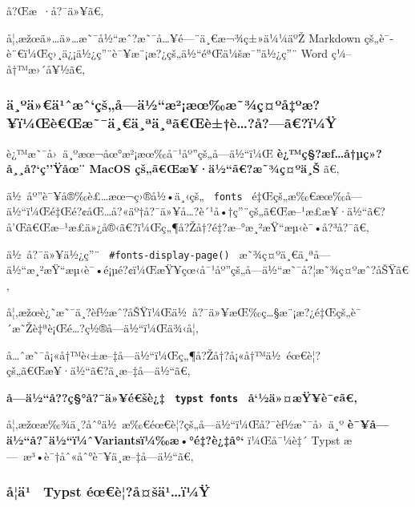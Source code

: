 å?Œæ~·å?¯ä»¥ã€‚

å¦‚æžœä»\ldots ä»\ldots æ˜¯å½``æˆ?æ˜¯å\ldots¥é---¨ä¸€æ¬¾ç±»ä¼¼äºŽ
Markdown çš„è¯­è¨€ï¼Œç›¸ä¿¡ä½¿ç''¨è¯¥æ¨¡æ?¿çš„ä½``éªŒä¼šæ¯''ä½¿ç''¨ Word
ç¼--å†™æ›´å¥½ã€‚

\subsubsection{ä¸ºä»€ä¹ˆæˆ`çš„å­---ä½``æ²¡æœ‰æ˜¾ç¤ºå‡ºæ?¥ï¼Œè€Œæ˜¯ä¸€ä¸ªä¸ªã€Œè±†è\ldots?å?---ã€?ï¼Ÿ}\label{uxe4uxbauxe4uxe4uxb9ux2c6uxe6ux2c6uxe7ux161uxe5uxe4uxbduxe6uxb2uxe6ux153uxe6uxbeuxe7uxbauxe5uxbauxe6uxefuxbcux153uxe8ux153uxe6uxe4uxe4uxaauxe4uxaauxe3ux153uxe8uxe8uxe5uxe3uxefuxbcuxff}

è¿™æ˜¯å›~ä¸ºæœ¬åœ°æ²¡æœ‰å¯¹åº''çš„å­---ä½``ï¼Œ
\textbf{è¿™ç§?æƒ\ldots å†µç»?å¸¸å?{}`ç''Ÿåœ¨ MacOS
çš„ã€Œæ¥·ä½``ã€?æ˜¾ç¤ºä¸Š} ã€‚

ä½~åº''è¯¥å®‰è£\ldots æœ¬ç›®å½•ä¸‹çš„ \texttt{\ fonts\ }
é‡Œçš„æ‰€æœ‰å­---ä½``ï¼Œé‡Œé?¢åŒ\ldots å?«äº†å?¯ä»¥å\ldots?è´¹å•†ç''¨çš„ã€Œæ--¹æ­£æ¥·ä½``ã€?å'Œã€Œæ--¹æ­£ä»¿å®‹ã€?ï¼Œç„¶å?Žå†?é‡?æ--°æ¸²æŸ``æµ‹è¯•å?³å?¯ã€‚

ä½~å?¯ä»¥ä½¿ç''¨ \texttt{\ \#fonts-display-page()\ }
æ˜¾ç¤ºä¸€ä¸ªå­---ä½``æ¸²æŸ``æµ‹è¯•é¡µé?¢ï¼ŒæŸ¥çœ‹å¯¹åº''çš„å­---ä½``æ˜¯å?¦æ˜¾ç¤ºæˆ?åŠŸã€‚

å¦‚æžœè¿˜æ˜¯ä¸?èƒ½æˆ?åŠŸï¼Œä½~å?¯ä»¥æŒ‰ç\ldots§æ¨¡æ?¿é‡Œçš„è¯´æ˜Žè‡ªè¡Œé\ldots?ç½®å­---ä½``ï¼Œä¾‹å¦‚

\begin{Shaded}
\begin{Highlighting}[]
\NormalTok{)}
\end{Highlighting}
\end{Shaded}

å\ldots ˆæ˜¯å¡«å†™è‹±æ--‡å­---ä½``ï¼Œç„¶å?Žå†?å¡«å†™ä½~éœ€è¦?çš„ã€Œæ¥·ä½``ã€?ä¸­æ--‡å­---ä½``ã€‚

\textbf{å­---ä½``å??ç§°å?¯ä»¥é€šè¿‡ \texttt{\ typst\ fonts\ }
å`½ä»¤æŸ¥è¯¢ã€‚}

å¦‚æžœæ‰¾ä¸?åˆ°ä½~æ‰€éœ€è¦?çš„å­---ä½``ï¼Œå?¯èƒ½æ˜¯å›~ä¸º
\textbf{è¯¥å­---ä½``å?˜ä½``ï¼ˆVariantsï¼‰æ•°é‡?è¿‡å°`} ï¼Œå¯¼è‡´ Typst
æ---~æ³•è¯†åˆ«åˆ°è¯¥ä¸­æ--‡å­---ä½``ã€‚

\subsubsection{å­¦ä¹~ Typst
éœ€è¦?å¤šä¹\ldots ï¼Ÿ}\label{uxe5uxe4uxb9-typst-uxe9ux153uxe8uxe5ux161uxe4uxb9uxefuxbcuxff}

